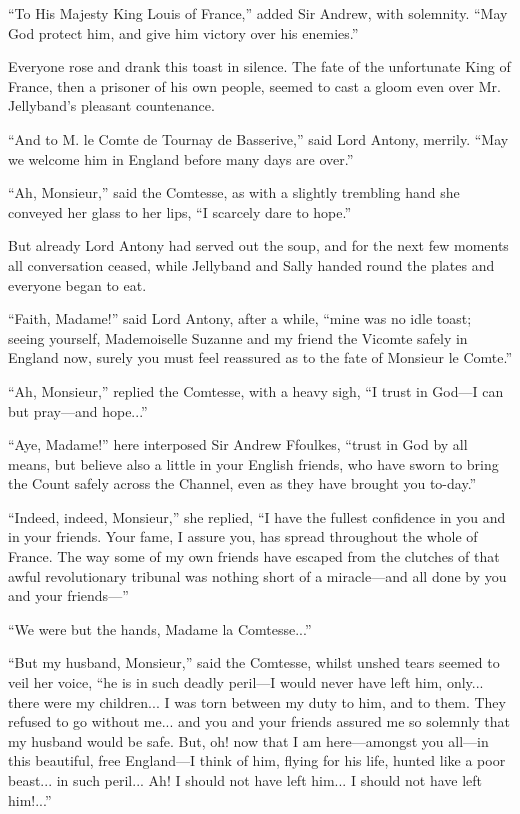 \documentclass[paper=a5,BCOR=7mm,twoside,DIV=calc,12pt,usegeometry,chapterprefix,endperiod,headings=big]{scrbook}
\begin{document}
\enquote{To His Majesty King Louis of France,} added Sir Andrew, with solemnity. \enquote{May God protect him, and give him victory over his enemies.}

Everyone rose and drank this toast in silence. The fate of the unfortunate King of France, then a prisoner of his own people, seemed to cast a gloom even over Mr. Jellyband's pleasant countenance.

\enquote{And to M. le Comte de Tournay de Basserive,} said Lord Antony, merrily. \enquote{May we welcome him in England before many days are over.}

\enquote{Ah, Monsieur,} said the Comtesse, as with a slightly trembling hand she conveyed her glass to her lips, \enquote{I scarcely dare to hope.}

But already Lord Antony had served out the soup, and for the next few moments all conversation ceased, while Jellyband and Sally handed round the plates and everyone began to eat.

\enquote{Faith, Madame!} said Lord Antony, after a while, \enquote{mine was no idle toast; seeing yourself, Mademoiselle Suzanne and my friend the Vicomte safely in England now, surely you must feel reassured as to the fate of Monsieur le Comte.}

\enquote{Ah, Monsieur,} replied the Comtesse, with a heavy sigh, \enquote{I trust in God---I can but pray---and hope...}

\enquote{Aye, Madame!} here interposed Sir Andrew Ffoulkes, \enquote{trust in God by all means, but believe also a little in your English friends, who have sworn to bring the Count safely across the Channel, even as they have brought you to-day.}

\enquote{Indeed, indeed, Monsieur,} she replied, \enquote{I have the fullest confidence in you and in your friends. Your fame, I assure you, has spread throughout the whole of France. The way some of my own friends have escaped from the clutches of that awful revolutionary tribunal was nothing short of a miracle---and all done by you and your  friends---}

\enquote{We were but the hands, Madame la Comtesse...}

\enquote{But my husband, Monsieur,} said the Comtesse, whilst unshed tears seemed to veil her voice, \enquote{he is in such deadly peril---I would never have left him, only... there were my children... I was torn between my duty to him, and to them. They refused to go without me... and you and your friends assured me so solemnly that my husband would be safe. But, oh! now that I am here---amongst you all---in this beautiful, free England---I think of him, flying for his life, hunted like a poor beast... in such peril... Ah! I should not have left him... I should not have left him!...}
\end{document}
